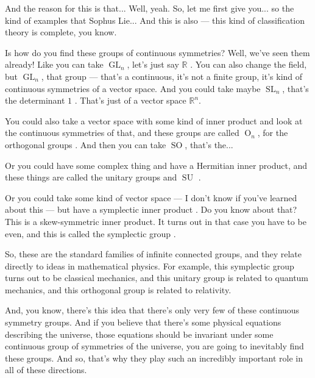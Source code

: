 \begin{speech}[00:38:18 - 00:40:22]
And the reason for this is that... Well, yeah. So, let me first give you... so the kind of examples that Sophus Lie... And this is also --- this kind of classification theory is complete, you know.

Is how do you find these groups of continuous symmetries? Well, we've seen them already! Like you can take $\operatorname{GL}_n$, let's just say $\mathbb{R}$ . You can also change the field, but $\operatorname{GL}_n$, that group --- that's a continuous, it's not a finite group, it's kind of continuous symmetries of a vector space. And you could take maybe $\operatorname{SL}_n$, that's the determinant $1$ . That's just of a vector space $\mathbb{R}^n$.

You could also take a vector space with some kind of inner product and look at the continuous symmetries of that, and these groups are called $\operatorname{O}_n$, for the orthogonal groups . And then you can take $\operatorname{SO}$, that's the... 

Or you could have some complex thing and have a Hermitian inner product, and these things are called the unitary groups and $\operatorname{SU}$ .

Or you could take some kind of vector space --- I don't know if you've learned about this --- but have a symplectic inner product . Do you know about that? This is a skew-symmetric inner product. It turns out in that case you have to be even, and this is called the symplectic group .

So, these are the standard families of infinite connected groups, and they relate directly to ideas in mathematical physics. For example, this symplectic group turns out to be classical mechanics, and this unitary group is related to quantum mechanics, and this orthogonal group is related to relativity.

And, you know, there's this idea that there's only very few of these continuous symmetry groups. And if you believe that there's some physical equations describing the universe, those equations should be invariant under some continuous group of symmetries of the universe, you are going to inevitably find these groups. And so, that's why they play such an incredibly important role in all of these directions.
\end{speech}

